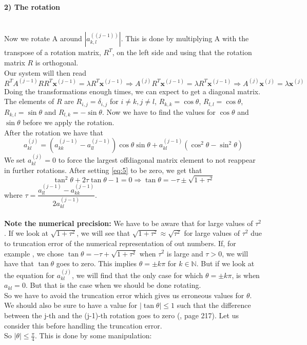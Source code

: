 \documentclass[12pt]{article}
\newcommand\jjj{(j)}
\newcommand\jj{(j-1)}
\begin{document}
	  \paragraph{2) The rotation}\hfill \\
	  Now we rotate A around $|a_{k,l}^{(\jj)}|$. This is done by multiplying A with the transpose of a rotation matrix, $R^T$, on the left side and using that the rotation matrix $R$ is orthogonal. \\Our system will then read 
	  $$
	  R^T A^{\jj} R R^T \mathbf{x}^{\jj} = \lambda R^T \mathbf{x}^{\jj} \Rightarrow A^{\jjj} R^T \mathbf{x}^{\jj} = \lambda R^T \mathbf{x}^{\jj} \Rightarrow A^{\jjj} \mathbf{x}^{\jjj} = \lambda \mathbf{x}^{\jjj}
	  $$
	  Doing the transformations enough times, we can expect to get a diagonal matrix.  The elements of $R$ are $R_{i,j} = \delta_{i,j} $ for $i \not = k, j \not = l$, $R_{k,k} = \cos \theta$, $R_{l,l} = \cos \theta$, $R_{k,l} = \sin \theta$ and $R_{l,k} = -\sin \theta$.  Now we have to find the values for $\cos\theta$ and $\sin\theta$ before we apply the rotation.\\
	  After the rotation we have that 
	  \begin{equation}\label{eq:5}
	  	a_{kl}^{\jjj} = (a_{kk}^{\jj} - a_{ll}^{\jj})\cos\theta\sin\theta + a_{kl}^{\jj}(\cos^2\theta - \sin^2\theta) 
	  \end{equation}We set $a_{kl}^{\jjj} = 0$ to force the largest offdiagonal matrix element to not reappear in further rotations. After setting \ref{eq:5} to be zero, we get that 
	  $$
	  	\tan^2\theta + 2\tau\tan\theta -1 = 0 
	  	\Rightarrow \tan\theta = -\tau \pm \sqrt{1+\tau^2}
	  $$
	  where $\tau = \dfrac{a_{ll}^{\jj} - a_{kk}^{\jj}}{2a_{kl}^{\jj}}$.\\ \\
	  \textbf{Note the numerical precision: }We have to be aware that for large values of $\tau^2$. If we look at $\sqrt{1 + \tau^2}$, we will see that $\sqrt{1 + \tau^2} \approx \sqrt{\tau^2} $ for large values of $\tau^2$ due to truncation error of the numerical representation of out numbers. If, for example , we chose $\tan\theta = -\tau + \sqrt{1+\tau^2}$ when $\tau^2$ is large and $\tau > 0$, we will have that $\tan\theta$ goes to zero. This implies $\theta = \pm k\pi$ for $k \in \mathbb{N}$. But if we look at the equation for $a_{kl}^{\jjj}$, we will find that the only case for which $\theta = \pm k \pi$, is when $a_{kl} = 0$. But that is the case when we should be done rotating.  \\
	  So we have to avoid the truncation error which gives us erroneous values for $\theta$.  \\We should also be sure to have a value for $|\tan\theta| \leq 1$ such that the difference between the j-th and the (j-1)-th rotation goes to zero (\cite{lectureNotes}, page 217). Let us consider this before handling the truncation error. \\So $|\theta| \leq \frac{\pi}{4}$.  This is done by some manipulation:
\end{document}
